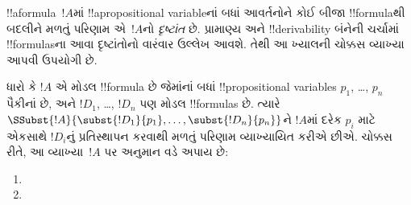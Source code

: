 \documentclass[../../../include/open-logic-section]{subfiles}
\begin{document}


!!a{formula}~$!A$માં !!a{propositional variable}નાં બધાં આવર્તનોને
કોઈ બીજા !!{formula}થી બદલીને મળતું પરિણામ એ~$!A$નો
\emph{દૃષ્ટાંત} છે. પ્રામાણ્ય અને !!{derivability} બંનેની ચર્ચામાં
!!{formula}sના આવા દૃષ્ટાંતોનો વારંવાર ઉલ્લેખ આવશે. તેથી આ ખ્યાલની
ચોક્કસ વ્યાખ્યા આપવી ઉપયોગી છે.

\begin{defn}
  ધારો કે $!A$ એ મોડલ !!{formula} છે જેમાંનાં બધાં !!{propositional
    variable}s $p_1$, \dots, $p_n$ પૈકીનાં છે, અને $!D_1$, \dots,
  $!D_n$ પણ મોડલ !!{formula}s છે. ત્યારે
  $\SSubst{!A}{\subst{!D_1}{p_1}, \dots, \subst{!D_n}{p_n}}$ને
  $!A$માં દરેક $p_i$ માટે એકસાથે $!D_i$નું પ્રતિસ્થાપન
  કરવાથી મળતું પરિણામ વ્યાખ્યાયિત કરીએ છીએ. ચોક્કસ રીતે,
  આ વ્યાખ્યા~$!A$ પર અનુમાન વડે અપાય છે:
  \begin{enumerate}
    \item {}
    \item {}
\end{enumerate}
\end{defn}
\end{document}
